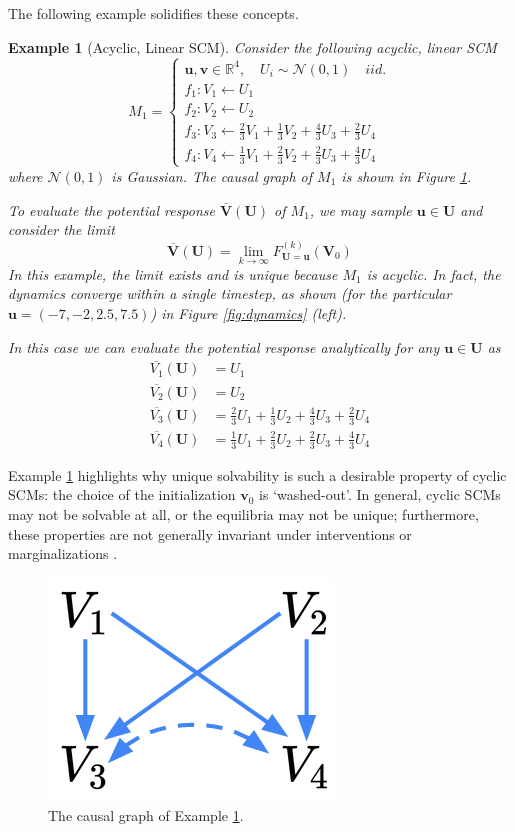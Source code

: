 \documentclass[letterpaper,10pt]{article}
\newtheorem{example}{Example}
\begin{document}
The following example solidifies these concepts.

\begin{example}[Acyclic, Linear SCM]\label{ex:acyclic-linear}
Consider the following acyclic, linear SCM
\[
M_1 = 
\begin{cases}
\mathbf{u}, \mathbf{v}\in \mathbb{R}^4, \quad U_i \sim \mathcal{N}(0,1) \quad iid. \\
f_1:V_1\leftarrow U_1 \\
f_2:V_2\leftarrow U_2 \\
f_3:V_3\leftarrow \frac{2}{3}V_1+\frac{1}{3}V_2+\frac{4}{3}U_3+\frac{2}{3}U_4 \\
f_4:V_4\leftarrow \frac{1}{3}V_1+\frac{2}{3}V_2+\frac{2}{3}U_3+\frac{4}{3}U_4
\end{cases}
\]
where $\mathcal{N}(0,1)$ is Gaussian.
The causal graph of $M_1$ is shown in Figure \ref{fig:acyclic-graph}.

To evaluate the potential response $\overline{\mathbf{V}}(\mathbf{U})$ of $M_1$, we may sample $\mathbf{u}\in\mathbf{U}$ and consider the limit
\[
\overline{\mathbf{V}}(\mathbf{U})= \lim_{k\to\infty}F_{\mathbf{U}=\mathbf{u}}^{(k)}(\mathbf{V}_0)
\]
In this example, the limit exists and is unique because $M_1$ is acyclic. In fact, the dynamics converge within a single timestep, as shown (for the particular $\mathbf{u}=(-7,-2,2.5,7.5)$) in Figure \ref{fig:dynamics} (left).

In this case we can evaluate the potential response analytically for any $\mathbf{u}\in\mathbf{U}$ as
\begin{align*}
\overline{V_1}(\mathbf{U}) &= U_1 \\
\overline{V_2}(\mathbf{U}) &= U_2 \\
\overline{V_3}(\mathbf{U}) &= \frac{2}{3}U_1+\frac{1}{3}U_2+\frac{4}{3}U_3+\frac{2}{3}U_4 \\
\overline{V_4}(\mathbf{U}) &= \frac{1}{3}U_1+\frac{2}{3}U_2+\frac{2}{3}U_3+\frac{4}{3}U_4
\end{align*}
\end{example}

Example \ref{ex:acyclic-linear} highlights why unique solvability is such a desirable property of cyclic SCMs: the choice of the initialization $\mathbf{v}_0$ is `washed-out'. In general, cyclic SCMs may not be solvable at all, or the equilibria may not be unique; furthermore, these properties are not generally invariant under interventions or marginalizations \cite{Foundations}.

\begin{figure}
\centering
\includegraphics[width=.2\linewidth]{pics/my_own/acyclic_graph.png}
\caption{The causal graph of Example \ref{ex:acyclic-linear}.}
\label{fig:acyclic-graph}
\end{figure}
\end{document}
